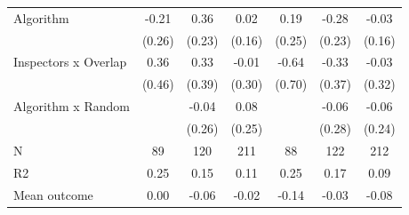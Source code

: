 \begin{tabular}{lccc|ccc}
Algorithm   &       -0.21         &        0.36         &        0.02         &        0.19         &       -0.28         &       -0.03         \\
            &      (0.26)         &      (0.23)         &      (0.16)         &      (0.25)         &      (0.23)         &      (0.16)         \\
\addlinespace
Inspectors x Overlap&        0.36         &        0.33         &       -0.01         &       -0.64         &       -0.33         &       -0.03         \\
            &      (0.46)         &      (0.39)         &      (0.30)         &      (0.70)         &      (0.37)         &      (0.32)         \\
\addlinespace
Algorithm x Random&                     &       -0.04         &        0.08         &                     &       -0.06         &       -0.06         \\
            &                     &      (0.26)         &      (0.25)         &                     &      (0.28)         &      (0.24)         \\
\midrule
N           &          89         &         120         &         211         &          88         &         122         &         212         \\
R2          &        0.25         &        0.15         &        0.11         &        0.25         &        0.17         &        0.09         \\
Mean outcome&        0.00         &       -0.06         &       -0.02         &       -0.14         &       -0.03         &       -0.08         \\
\bottomrule \end{tabular}
